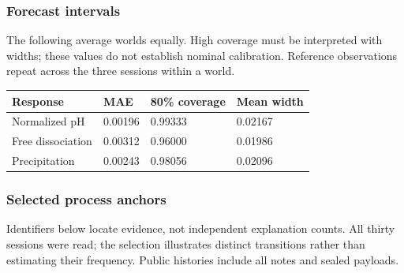 \documentclass[10pt,a4paper]{article}
\begin{document}
\subsubsection{Forecast intervals}\label{forecast-intervals}

The following average worlds equally. High coverage must be interpreted with widths; these values do not establish nominal calibration. Reference observations repeat across the three sessions within a world.

{\def\LTcaptype{table} %
\small\begin{longtable}[]{@{}llll@{}}
\toprule\noalign{}
Response & MAE & 80\% coverage & Mean width \\
\midrule\noalign{}
\endhead
\bottomrule\noalign{}
\endlastfoot
Normalized pH & 0.00196 & 0.99333 & 0.02167 \\
Free dissociation & 0.00312 & 0.96000 & 0.01986 \\
Precipitation & 0.00243 & 0.98056 & 0.02096 \\
\end{longtable}\normalsize
}

\subsubsection{Selected process anchors}\label{selected-process-anchors}

Identifiers below locate evidence, not independent explanation counts. All thirty sessions were read; the selection illustrates distinct transitions rather than estimating their frequency. Public histories include all notes and sealed payloads.
\end{document}

